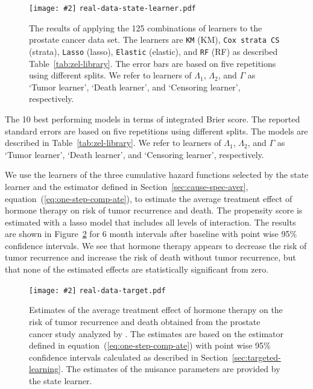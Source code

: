 \documentclass[numsec,webpdf,contemporary,medium,namedate]{oup-authoring-template}%
\theoremstyle{thmstyleone}%
\theoremstyle{thmstyletwo}%
\theoremstyle{thmstylethree}%
\newcommand{\includeFigCond}[2][]{
  \ifx\nofig\undefined %
    \texttt{[image: \#2]} %
  \else %
    \texttt{#2} %
  \fi %
}
\newcommand{\1}{\mathds{1}}
\begin{document}
\begin{figure}
  \centering %
  \includeFigCond[width=.9\linewidth]{real-data-state-learner.pdf}
  \caption[]{The results of applying the 125 combinations of learners to the
    prostate cancer data set. The learners are \texttt{KM} (KM), \texttt{Cox
      strata CS} (strata), \texttt{Lasso} (lasso), \texttt{Elastic} (elastic),
    and \texttt{RF} (RF) as described Table~\ref{tab:zel-library}. The error
    bars are based on five repetitions using different splits. We refer to
    learners of \( \Lambda_1 \), \( \Lambda_2 \), and $\Gamma$ as `Tumor
    learner', `Death learner', and `Censoring learner', respectively.}
  \label{fig:zelefski-real}
\end{figure}


\begin{table}
  \caption{\label{tab:zelefski-real}The 10 best performing models in terms of integrated Brier score. The
    reported standard errors are based on five repetitions using different
    splits. The models are described in Table~\ref{tab:zel-library}. We refer to
    learners of \( \Lambda_1 \), \( \Lambda_2 \), and $\Gamma$ as `Tumor
    learner', `Death learner', and `Censoring learner', respectively.}
  \centering
  
\end{table}



We use the learners of the three cumulative hazard functions
selected by the state learner and the estimator defined in
Section~\ref{sec:cause-spec-aver}, equation~(\ref{eq:one-step-comp-ate}), to
estimate the average treatment effect of hormone therapy on risk of tumor
recurrence and death. The propensity score is estimated with a lasso model that
includes all levels of interaction. The results are shown in
Figure~\ref{fig:zelefski-real-target} for 6 month intervals after baseline with
point wise 95\% confidence intervals. We see that hormone therapy appears to
decrease the risk of tumor recurrence and increase the risk of death without
tumor recurrence, but that none of the estimated effects are statistically
significant from zero.

\begin{figure}
  \centering%
  \includeFigCond[width=.8\linewidth]{real-data-target.pdf}
  \caption[]{Estimates of the average treatment effect of hormone therapy on the
    risk of tumor recurrence and death obtained from the prostate cancer study
    analyzed by \cite{kattan2000pretreatment}. The estimates are based on the
    estimator defined in equation~(\ref{eq:one-step-comp-ate}) with point wise
    95\% confidence intervals calculated as described in
    Section~\ref{sec:targeted-learning}. The estimates of the nuisance
    parameters are provided by the state learner.}
  \label{fig:zelefski-real-target}
\end{figure}
\end{document}
